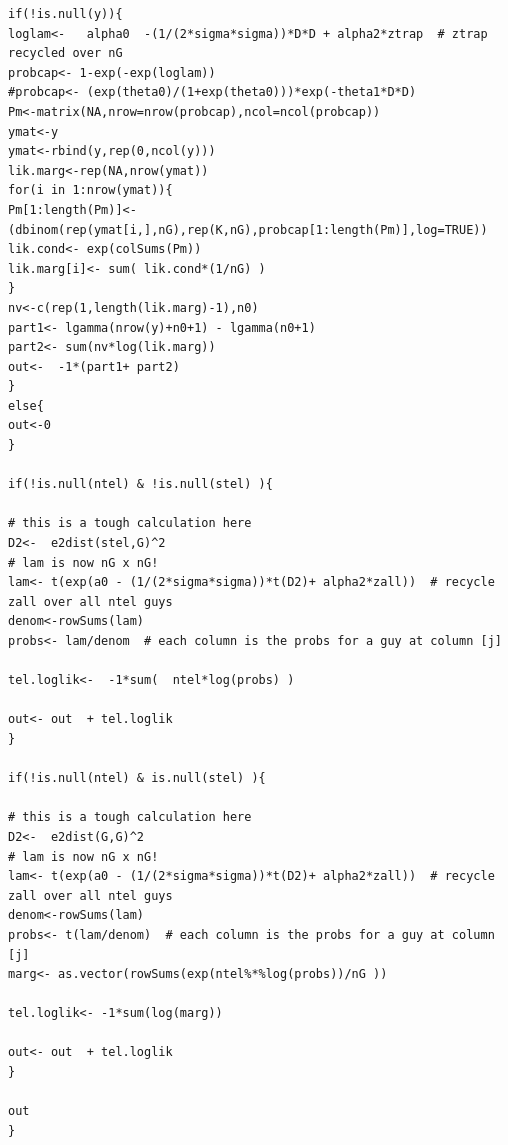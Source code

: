 \documentclass[12pt]{article}
\begin{document}
{\begin{verbatim}
if(!is.null(y)){
loglam<-   alpha0  -(1/(2*sigma*sigma))*D*D + alpha2*ztrap  # ztrap recycled over nG
probcap<- 1-exp(-exp(loglam))
#probcap<- (exp(theta0)/(1+exp(theta0)))*exp(-theta1*D*D)
Pm<-matrix(NA,nrow=nrow(probcap),ncol=ncol(probcap))
ymat<-y
ymat<-rbind(y,rep(0,ncol(y)))
lik.marg<-rep(NA,nrow(ymat))
for(i in 1:nrow(ymat)){
Pm[1:length(Pm)]<- (dbinom(rep(ymat[i,],nG),rep(K,nG),probcap[1:length(Pm)],log=TRUE))
lik.cond<- exp(colSums(Pm))
lik.marg[i]<- sum( lik.cond*(1/nG) )
}
nv<-c(rep(1,length(lik.marg)-1),n0)
part1<- lgamma(nrow(y)+n0+1) - lgamma(n0+1)
part2<- sum(nv*log(lik.marg))
out<-  -1*(part1+ part2)
}
else{
out<-0
}

if(!is.null(ntel) & !is.null(stel) ){

# this is a tough calculation here
D2<-  e2dist(stel,G)^2
# lam is now nG x nG!
lam<- t(exp(a0 - (1/(2*sigma*sigma))*t(D2)+ alpha2*zall))  # recycle zall over all ntel guys
denom<-rowSums(lam)
probs<- lam/denom  # each column is the probs for a guy at column [j]

tel.loglik<-  -1*sum(  ntel*log(probs) )

out<- out  + tel.loglik
}

if(!is.null(ntel) & is.null(stel) ){

# this is a tough calculation here
D2<-  e2dist(G,G)^2
# lam is now nG x nG!
lam<- t(exp(a0 - (1/(2*sigma*sigma))*t(D2)+ alpha2*zall))  # recycle zall over all ntel guys
denom<-rowSums(lam)
probs<- t(lam/denom)  # each column is the probs for a guy at column [j]
marg<- as.vector(rowSums(exp(ntel%*%log(probs))/nG ))

tel.loglik<- -1*sum(log(marg))

out<- out  + tel.loglik
}

out
}

\end{verbatim}
}





\clearpage
\newpage
\end{document}
